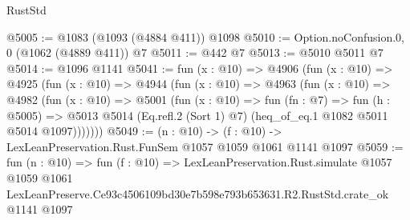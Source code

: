 \begin{lexlean}{RustStd}
\begin{coremodule}
@5005 := @1083 (@1093 (@4884 @411)) @1098
@5010 := Option.noConfusion.{0, 0} (@1062 (@4889 @411)) @7
@5011 := @442 @7
@5013 := @5010 @5011 @7
@5014 := @1096 @1141
@5041 := fun (x : @10) =>
  @4906
    (fun (x : @10) =>
    @4925
      (fun (x : @10) =>
      @4944
        (fun (x : @10) =>
        @4963
          (fun (x : @10) =>
          @4982
            (fun (x : @10) =>
            @5001
              (fun (x : @10) =>
              fun (fn : @7) =>
              fun (h : @5005) =>
              @5013 @5014 (Eq.refl.{2} (Sort 1) @7) (heq_of_eq.{1} @1082 @5011 @5014 @1097)))))))
@5049 := (n : @10) -> (f : @10) -> LexLeanPreservation.Rust.FunSem @1057 @1059 @1061 @1141 @1097
@5059 := fun (n : @10) =>
  fun (f : @10) =>
  LexLeanPreservation.Rust.simulate
    @1057
    @1059
    @1061
    LexLeanPreserve.Ce93c4506109bd30e7b598e793b653631.R2.RustStd.crate_ok
    @1141
    @1097
\end{coremodule}
\end{lexlean}

